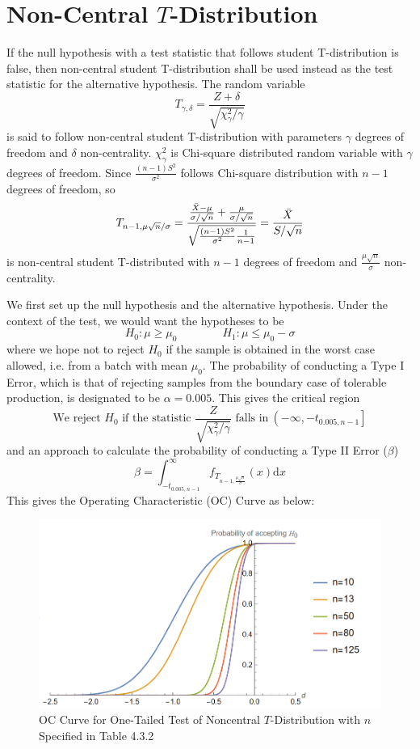 \documentclass{article}
\def\d{\mathrm{d}}
\begin{document}
\section{Non-Central $T$-Distribution}

If the null hypothesis with a test statistic that follows student T-distribution is false, then non-central student T-distribution shall be used instead as the test statistic for the alternative hypothesis. The random variable
$$
T_{\gamma, \delta}=\frac{Z+\delta}{\sqrt{\chi_\gamma^2/\gamma}}
$$
is said to follow non-central student T-distribution with parameters $\gamma$ degrees of freedom and $\delta$ non-centrality. $\chi_{\gamma}^2$ is Chi-square distributed random variable with $\gamma$ degrees of freedom. Since $\frac{(n-1)S^2}{\sigma^2}$ follows Chi-square distribution with $n-1$ degrees of freedom, so
$$
T_{n-1,\mu\sqrt{n}/\sigma}=\frac{\frac{\Bar{X}-\mu}{\sigma/\sqrt{n}}+\frac{\mu}{\sigma/\sqrt{n}}}{\sqrt{\frac{(n-1)S^2}{\sigma^2}\frac{1}{n-1}}}=\frac{\Bar{X}}{S/\sqrt{n}}
$$
is non-central student T-distributed with $n-1$ degrees of freedom and $\frac{\mu\sqrt{n}}{\sigma}$ non-centrality.

We first set up the null hypothesis and the alternative hypothesis. Under the context of the test, we would want the hypotheses to be
$$
H_0 : \mu\geq\mu_0 \quad\quad\quad\quad H_1 : \mu\leq\mu_0 - \sigma
$$
where we hope not to reject $H_0$ if the sample is obtained in the worst case allowed, i.e. from a batch with mean $\mu_0$. The probability of conducting a Type I Error, which is that of rejecting samples from the boundary case of tolerable production, is designated to be $\alpha = 0.005$. This gives the critical region
$$
\text{We reject }H_0\text{ if the statistic } \dfrac{Z}{\sqrt{\chi_{\gamma}^2/\gamma}} \text{ falls in}\ \left(-\infty, -t_{0.005, n-1}\right]
$$
and an approach to calculate the probability of conducting a Type II Error ($\beta$)
$$
\beta = \int_{-t_{0.005, n-1}}^{\infty} f_{T_{n-1, \frac{\mu\sqrt{n}}{\sigma}}}(x) \d x
$$
This gives the Operating Characteristic (OC) Curve as below:

\begin{figure}[htbp]
    \centering
    \includegraphics[scale=0.5]{img/oc_noncentral_t.png}
    \caption{OC Curve for One-Tailed Test of Noncentral $T$-Distribution with $n$ Specified in Table 4.3.2}
\end{figure}
\end{document}
